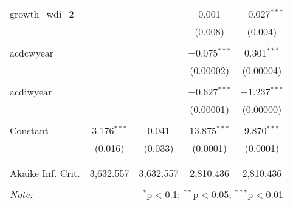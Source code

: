 \begin{table}[!htbp]
\begin{tabular}{@{\extracolsep{5pt}}lcccc}
 growth\_wdi\_2 &  &  & 0.001 & $-$0.027$^{***}$ \\ 
  &  &  & (0.008) & (0.004) \\ 
  & & & & \\ 
 acdcwyear &  &  & $-$0.075$^{***}$ & 0.301$^{***}$ \\ 
  &  &  & (0.00002) & (0.00004) \\ 
  & & & & \\ 
 acdiwyear &  &  & $-$0.627$^{***}$ & $-$1.237$^{***}$ \\ 
  &  &  & (0.00001) & (0.00000) \\ 
  & & & & \\ 
 Constant & 3.176$^{***}$ & 0.041 & 13.875$^{***}$ & 9.870$^{***}$ \\ 
  & (0.016) & (0.033) & (0.0001) & (0.0001) \\ 
  & & & & \\ 
\hline \\[-1.8ex] 
Akaike Inf. Crit. & 3,632.557 & 3,632.557 & 2,810.436 & 2,810.436 \\ 
\hline 
\hline \\[-1.8ex] 
\textit{Note:}  & \multicolumn{4}{r}{$^{*}$p$<$0.1; $^{**}$p$<$0.05; $^{***}$p$<$0.01} \\ 
\end{tabular} 
\end{table} 
